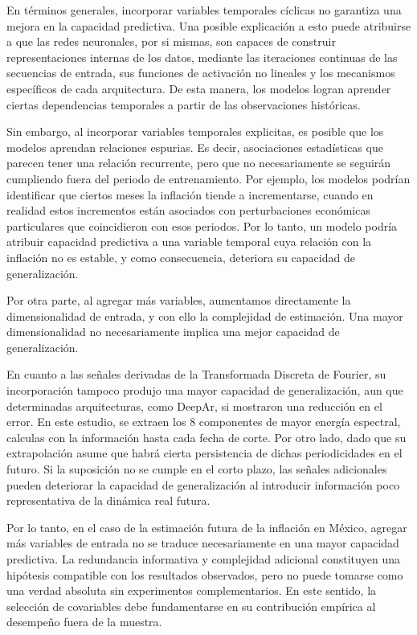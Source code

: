 \documentclass[12pt,letterpaper]{article}
\begin{document}
En términos generales, incorporar variables temporales cíclicas no garantiza una mejora en la capacidad predictiva. Una posible explicación a esto puede atribuirse a que las redes neuronales, por si mismas, son capaces de construir representaciones internas de los datos, mediante las iteraciones continuas de las secuencias de entrada, sus funciones de activación no lineales y los mecanismos específicos de cada arquitectura. De esta manera, los modelos logran aprender ciertas dependencias temporales a partir de las observaciones históricas.

Sin embargo, al incorporar variables temporales explicitas, es posible que los modelos aprendan relaciones espurias. Es decir, asociaciones estadísticas que parecen tener una relación recurrente, pero que no necesariamente se seguirán cumpliendo fuera del periodo de entrenamiento. Por ejemplo, los modelos podrían identificar que ciertos meses la inflación tiende a incrementarse, cuando en realidad estos incrementos están asociados con perturbaciones económicas particulares que coincidieron con esos periodos. Por lo tanto, un modelo podría atribuir capacidad predictiva a una variable temporal cuya relación con la inflación no es estable, y como consecuencia, deteriora su capacidad de generalización.

Por otra parte, al agregar más variables, aumentamos directamente la dimensionalidad de entrada, y con ello la complejidad de estimación. Una mayor dimensionalidad no necesariamente implica una mejor capacidad de generalización.

En cuanto a las señales derivadas de la Transformada
Discreta de Fourier, su incorporación tampoco produjo
una mayor capacidad de generalización, aun que determinadas arquitecturas, como DeepAr, si mostraron una reducción en el error. En este estudio, se extraen los 8 componentes de mayor energía espectral, calculas con la información hasta cada fecha de corte. Por otro lado, dado que su extrapolación asume que habrá cierta persistencia de dichas periodicidades en el futuro. Si la suposición no se cumple en el corto plazo, las señales adicionales pueden deteriorar la capacidad de generalización al introducir información poco representativa de la dinámica real futura. 

Por lo tanto, en el caso de la estimación futura de la inflación en México, agregar más variables de entrada no se traduce necesariamente en una mayor capacidad predictiva. La redundancia informativa y complejidad adicional constituyen una hipótesis compatible con los resultados observados, pero no puede tomarse como una verdad absoluta sin experimentos complementarios. En este sentido, la selección de covariables debe fundamentarse en su contribución empírica al desempeño fuera de la muestra. 
\end{document}
